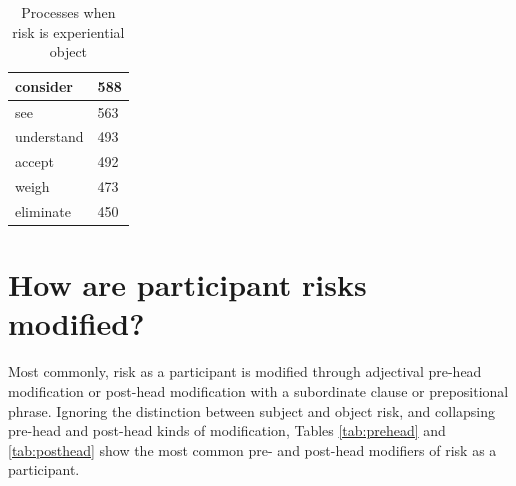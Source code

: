 \begin{table}[htb!]
{\begin{minipage}{.35\textwidth}
\begin{tabularx}{1.0\textwidth}{|>{\raggedright}X|l|}
										consider                                         & 588   \\ \hline
										see                                              & 563   \\ \hline
										understand                                       & 493   \\ \hline
										accept                                           & 492   \\ \hline
										weigh & 473   \\ \hline
										eliminate & 450   \\ \hline
			
										\end{tabularx}
										\caption{Processes when risk is experiential object}
										\label{tab:obj}
										\end{minipage}}
										\end{table}


	\section{How are participant risks modified?}
	\FloatBarrier

				Most commonly, risk as a participant is modified through adjectival pre-head modification or post-head modification with a subordinate clause or prepositional phrase. Ignoring the distinction between subject and object risk, and collapsing pre-head and post-head kinds of modification, Tables \ref{tab:prehead} and \ref{tab:posthead} show the most common pre- and post-head modifiers of risk as a participant.

